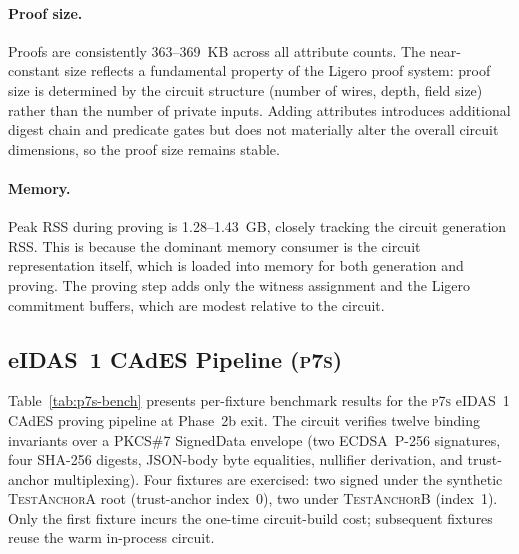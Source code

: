 \paragraph{Proof size.}
Proofs are consistently 363--369~KB across all attribute counts.
The near-constant size reflects a fundamental property of the Ligero proof system: proof size is determined by the circuit structure (number of wires, depth, field size) rather than the number of private inputs.
Adding attributes introduces additional digest chain and predicate gates but does not materially alter the overall circuit dimensions, so the proof size remains stable.

\paragraph{Memory.}
Peak RSS during proving is 1.28--1.43~GB, closely tracking the circuit generation RSS.
This is because the dominant memory consumer is the circuit representation itself, which is loaded into memory for both generation and proving.
The proving step adds only the witness assignment and the Ligero commitment buffers, which are modest relative to the circuit.

\subsection{eIDAS~1 CAdES Pipeline (\textsc{p7s})}\label{sec:bench-p7s}

Table~\ref{tab:p7s-bench} presents per-fixture benchmark results for the \textsc{p7s} eIDAS~1 CAdES proving pipeline at Phase~2b exit.
The circuit verifies twelve binding invariants over a PKCS\#7 SignedData envelope (two ECDSA~P-256 signatures, four SHA-256 digests, JSON-body byte equalities, nullifier derivation, and trust-anchor multiplexing).
Four fixtures are exercised: two signed under the synthetic \textsc{TestAnchorA} root (trust-anchor index~0), two under \textsc{TestAnchorB} (index~1).
Only the first fixture incurs the one-time circuit-build cost; subsequent fixtures reuse the warm in-process circuit.

